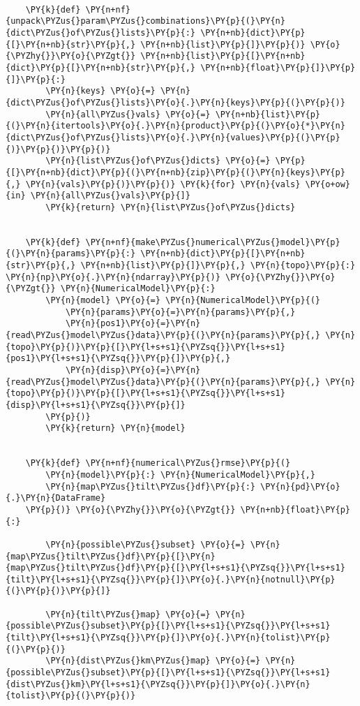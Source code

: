 \begin{tcolorbox}[breakable, size=fbox, boxrule=1pt, pad at break*=1mm,colback=cellbackground, colframe=cellborder]
\begin{Verbatim}[commandchars=\\\{\}]
    
    \PY{k}{def} \PY{n+nf}{unpack\PYZus{}param\PYZus{}combinations}\PY{p}{(}\PY{n}{dict\PYZus{}of\PYZus{}lists}\PY{p}{:} \PY{n+nb}{dict}\PY{p}{[}\PY{n+nb}{str}\PY{p}{,} \PY{n+nb}{list}\PY{p}{]}\PY{p}{)} \PY{o}{\PYZhy{}}\PY{o}{\PYZgt{}} \PY{n+nb}{list}\PY{p}{[}\PY{n+nb}{dict}\PY{p}{[}\PY{n+nb}{str}\PY{p}{,} \PY{n+nb}{float}\PY{p}{]}\PY{p}{]}\PY{p}{:}
        \PY{n}{keys} \PY{o}{=} \PY{n}{dict\PYZus{}of\PYZus{}lists}\PY{o}{.}\PY{n}{keys}\PY{p}{(}\PY{p}{)}
        \PY{n}{all\PYZus{}vals} \PY{o}{=} \PY{n+nb}{list}\PY{p}{(}\PY{n}{itertools}\PY{o}{.}\PY{n}{product}\PY{p}{(}\PY{o}{*}\PY{n}{dict\PYZus{}of\PYZus{}lists}\PY{o}{.}\PY{n}{values}\PY{p}{(}\PY{p}{)}\PY{p}{)}\PY{p}{)}
        \PY{n}{list\PYZus{}of\PYZus{}dicts} \PY{o}{=} \PY{p}{[}\PY{n+nb}{dict}\PY{p}{(}\PY{n+nb}{zip}\PY{p}{(}\PY{n}{keys}\PY{p}{,} \PY{n}{vals}\PY{p}{)}\PY{p}{)} \PY{k}{for} \PY{n}{vals} \PY{o+ow}{in} \PY{n}{all\PYZus{}vals}\PY{p}{]}
        \PY{k}{return} \PY{n}{list\PYZus{}of\PYZus{}dicts}
    
    
    \PY{k}{def} \PY{n+nf}{make\PYZus{}numerical\PYZus{}model}\PY{p}{(}\PY{n}{params}\PY{p}{:} \PY{n+nb}{dict}\PY{p}{[}\PY{n+nb}{str}\PY{p}{,} \PY{n+nb}{list}\PY{p}{]}\PY{p}{,} \PY{n}{topo}\PY{p}{:} \PY{n}{np}\PY{o}{.}\PY{n}{ndarray}\PY{p}{)} \PY{o}{\PYZhy{}}\PY{o}{\PYZgt{}} \PY{n}{NumericalModel}\PY{p}{:}
        \PY{n}{model} \PY{o}{=} \PY{n}{NumericalModel}\PY{p}{(}
            \PY{n}{params}\PY{o}{=}\PY{n}{params}\PY{p}{,}
            \PY{n}{pos1}\PY{o}{=}\PY{n}{read\PYZus{}model\PYZus{}data}\PY{p}{(}\PY{n}{params}\PY{p}{,} \PY{n}{topo}\PY{p}{)}\PY{p}{[}\PY{l+s+s1}{\PYZsq{}}\PY{l+s+s1}{pos1}\PY{l+s+s1}{\PYZsq{}}\PY{p}{]}\PY{p}{,}
            \PY{n}{disp}\PY{o}{=}\PY{n}{read\PYZus{}model\PYZus{}data}\PY{p}{(}\PY{n}{params}\PY{p}{,} \PY{n}{topo}\PY{p}{)}\PY{p}{[}\PY{l+s+s1}{\PYZsq{}}\PY{l+s+s1}{disp}\PY{l+s+s1}{\PYZsq{}}\PY{p}{]}
        \PY{p}{)}
        \PY{k}{return} \PY{n}{model}
    
    
    \PY{k}{def} \PY{n+nf}{numerical\PYZus{}rmse}\PY{p}{(}
        \PY{n}{model}\PY{p}{:} \PY{n}{NumericalModel}\PY{p}{,}
        \PY{n}{map\PYZus{}tilt\PYZus{}df}\PY{p}{:} \PY{n}{pd}\PY{o}{.}\PY{n}{DataFrame}
    \PY{p}{)} \PY{o}{\PYZhy{}}\PY{o}{\PYZgt{}} \PY{n+nb}{float}\PY{p}{:}
    
        \PY{n}{possible\PYZus{}subset} \PY{o}{=} \PY{n}{map\PYZus{}tilt\PYZus{}df}\PY{p}{[}\PY{n}{map\PYZus{}tilt\PYZus{}df}\PY{p}{[}\PY{l+s+s1}{\PYZsq{}}\PY{l+s+s1}{tilt}\PY{l+s+s1}{\PYZsq{}}\PY{p}{]}\PY{o}{.}\PY{n}{notnull}\PY{p}{(}\PY{p}{)}\PY{p}{]}
    
        \PY{n}{tilt\PYZus{}map} \PY{o}{=} \PY{n}{possible\PYZus{}subset}\PY{p}{[}\PY{l+s+s1}{\PYZsq{}}\PY{l+s+s1}{tilt}\PY{l+s+s1}{\PYZsq{}}\PY{p}{]}\PY{o}{.}\PY{n}{tolist}\PY{p}{(}\PY{p}{)}
        \PY{n}{dist\PYZus{}km\PYZus{}map} \PY{o}{=} \PY{n}{possible\PYZus{}subset}\PY{p}{[}\PY{l+s+s1}{\PYZsq{}}\PY{l+s+s1}{dist\PYZus{}km}\PY{l+s+s1}{\PYZsq{}}\PY{p}{]}\PY{o}{.}\PY{n}{tolist}\PY{p}{(}\PY{p}{)}
    

\end{Verbatim}
\end{tcolorbox}
